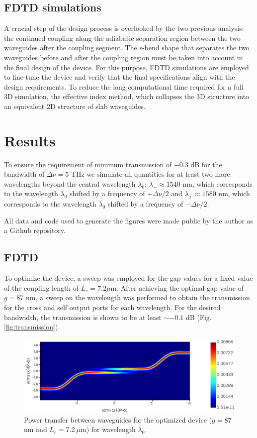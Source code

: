 \documentclass[conference]{IEEEtran}
\begin{document}
\subsection{FDTD simulations}
A crucial step of the design process is overlooked by the two previous analysis: the continued coupling along the adiabatic separation region between the two waveguides after the coupling segment. The s-bend shape that separates the two waveguides before and after the coupling region must be taken into account in the final design of the device. For this purpose, FDTD simulations are employed to fine-tune the device and verify that the final specifications align with the design requirements. To reduce the long computational time required for a full 3D simulation, the effective index method, which collapses the 3D structure into an equivalent 2D structure of slab waveguides.

\section{Results}
To ensure the requirement of minimum transmission of $-0.3$ dB for the bandwidth of $\Delta\nu = 5 $ THz we simulate all quantities for at least two more wavelengths beyond the central wavelength $\lambda_0$: $\lambda_- \approx 1540$ nm, which corresponds to the wavelength $\lambda_0$ shifted by a frequency of $+\Delta\nu /2$ and $\lambda_+ \approx 1580$ nm, which corresponds to the wavelength $\lambda_0$ shifted by a frequency of $-\Delta\nu /2$.


All data and code used to generate the figures were made public by the author as a Github repository\cite{my_git}.

\subsection{FDTD}
To optimize the device, a sweep was employed for the gap values for a fixed value of the coupling length of $L_c = 7.2 \mu\text{m}$. After achieving the optimal gap value of $g=87$ nm, a sweep on the wavelength was performed to obtain the transmission for the cross and self output ports for each wavelength. For the desired bandwidth, the transmission is shown to be at least $\sim -0.1 $ dB  (Fig. \ref{fig:transmission}).
\begin{figure}[H]
\centerline{\includegraphics[width=0.99\linewidth]{projeto2/figs/z-slice-power.pdf}}
\caption{  Power transfer between waveguides for the optimized device ($g=87$ nm and $L_c = 7.2\ \mu\text{m}$) for wavelength $\lambda_0$.}
\label{fig:z_slice_power}
\end{figure}
\end{document}
